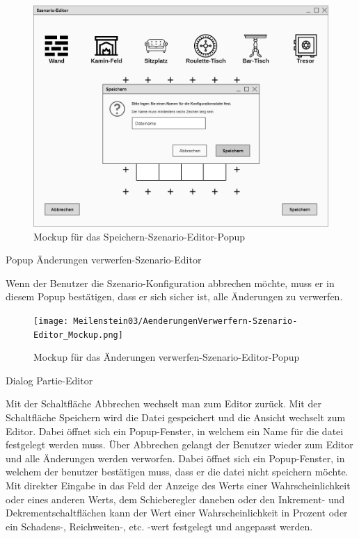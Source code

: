 \begin{figure}
  \centering
  \includegraphics[width=\textwidth]{Meilenstein03/Speichern-Szenario-Editor_Mockup.png}
  \caption{Mockup für das Speichern-Szenario-Editor-Popup}
\end{figure}

Popup \glqq{}Änderungen verwerfen-Szenario-Editor\grqq{}

Wenn der Benutzer die Szenario-Konfiguration abbrechen möchte, muss er in diesem Popup bestätigen, dass er sich sicher ist, alle Änderungen zu verwerfen.

\begin{figure}
  \centering
  \texttt{[image: Meilenstein03/AenderungenVerwerfern-Szenario-Editor\_Mockup.png]}
  \caption{Mockup für das Änderungen verwerfen-Szenario-Editor-Popup}
\end{figure}

Dialog \glqq{}Partie-Editor\grqq{}

Mit der Schaltfläche \glqq{}Abbrechen\grqq{} wechselt man zum Editor zurück. Mit der Schaltfläche \glqq{}Speichern\grqq{} wird die Datei gespeichert und die Ansicht wechselt zum Editor. Dabei öffnet sich ein Popup-Fenster, in welchem ein Name für die datei festgelegt werden muss. Über Abbrechen gelangt der Benutzer wieder zum Editor und alle Änderungen werden verworfen. Dabei öffnet sich ein Popup-Fenster, in welchem der benutzer bestätigen muss, dass er die datei nicht speichern möchte. Mit direkter Eingabe in das Feld der Anzeige des Werts einer Wahrscheinlichkeit oder eines anderen Werts, dem Schieberegler daneben oder den Inkrement- und Dekrementschaltflächen kann der Wert einer Wahrscheinlichkeit in Prozent oder ein Schadens-, Reichweiten-, etc. -wert festgelegt und angepasst werden.

